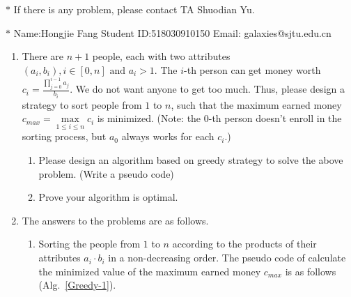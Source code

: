 \documentclass[12pt,a4paper]{article}
\makeatletter
\newtheorem*{solution}{Solution}
\theoremstyle{definition}
\renewenvironment{solution}[1][Solution] {\par\pushQED{\qed}\normalfont\topsep6\p@\@plus6\p@\relax\trivlist\item[\hskip\labelsep\bfseries#1\@addpunct{.}]\ignorespaces}{\popQED\endtrivlist\@endpefalse} \makeatother
\makeatother
\begin{document}
\noindent

\noindent{}
\begin{center}
\footnotesize{\color{red}$*$ If there is any problem, please contact TA Shuodian Yu.}

\footnotesize{\color{blue}$*$ Name:Hongjie Fang  \quad Student ID:518030910150 \quad Email: galaxies@sjtu.edu.cn}
\end{center}

\begin{enumerate}
    \item
    There are $n+1$ people, each with two attributes $(a_i,b_i), i\in[0,n] \text{ and } a_i>1$. The $i$-th person can get money worth $c_i = \frac{\prod_{j=0}^{i-1}{a_j}}{b_i}$. We do not want anyone to get too much. Thus, please design a strategy to sort people from $1$ to $n$, such that the maximum earned money $c_{max}=\max\limits_{1\leq i\leq n} c_i$ is minimized. (Note: the 0-th person doesn't enroll in the sorting process, but $a_0$ always works for each $c_i$.)
    \begin{enumerate}
        \item Please design an algorithm based on greedy strategy to solve the above problem. (Write a pseudo code)
        \item Prove your algorithm is optimal.
    \end{enumerate}

   \begin{solution} The answers to the problems are as follows.
   \begin{enumerate}
   \item Sorting the people from $1$ to $n$ according to the products of their attributes $a_i \cdot b_i$ in a non-decreasing order. The pseudo code of calculate the minimized value of the maximum earned money $c_{max}$ is as follows (Alg.~\ref{Greedy-1}).

       \begin{minipage}[t]{0.8\textwidth}
        \begin{algorithm}[H]


\end{algorithm}
\end{minipage}
\end{enumerate}
\end{solution}
\end{enumerate}
\end{document}
